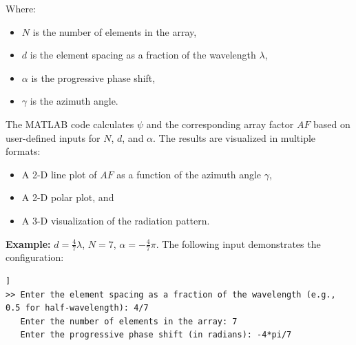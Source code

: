 \documentclass[a4paper, 12pt, english]{article}
\begin{document}
\noindent
Where:
\begin{itemize}
    \item $ {N} $ is the number of elements in the array,
    \item $ {d} $ is the element spacing as a fraction of the wavelength $ {\lambda} $,
    \item $ {\alpha} $ is the progressive phase shift,
    \item $ {\gamma} $ is the azimuth angle.
\end{itemize}

\noindent
The MATLAB code calculates $ {\psi} $ and the corresponding array factor $ {AF} $ based on user-defined inputs for $ {N} $, $ {d} $, and $ {\alpha} $. The results are visualized in multiple formats:
\begin{itemize}
    \item A 2-D line plot of $ {AF} $ as a function of the azimuth angle $ {\gamma} $,
    \item A 2-D polar plot, and
    \item A 3-D visualization of the radiation pattern.
\end{itemize}

\noindent
\textbf{Example:} $ {d} = {\frac{4}{7}}{\lambda} $, $ {N} = {7} $, $ {\alpha} = -{\frac{4}{7}}{\pi} $.
\newline
The following input demonstrates the configuration:
\begin{lstlisting}[style=commandstyle,caption=Command line output]]
>> Enter the element spacing as a fraction of the wavelength (e.g., 0.5 for half-wavelength): 4/7
   Enter the number of elements in the array: 7
   Enter the progressive phase shift (in radians): -4*pi/7
\end{lstlisting}
\end{document}
